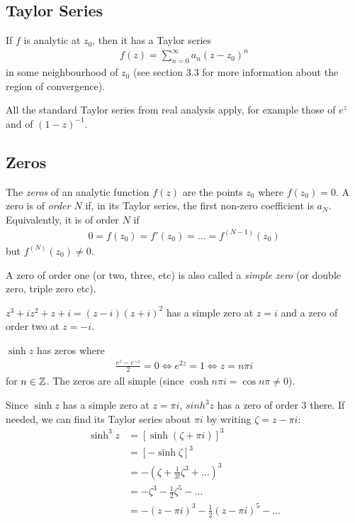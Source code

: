 \documentclass[a4paper]{article}
\begin{document}
\subsection{Taylor Series}
If $f$ is analytic at $z_0$, then it has a Taylor series 
\begin{equation*}
\begin{aligned}
f(z) = \sum_{n=0}^\infty a_n(z-z_0)^n
\end{aligned}
\end{equation*}
in some neighbourhood of $z_0$ (see section 3.3 for more information about the region of convergence).

All the standard Taylor series from real analysis apply, for example those of $e^z$ and of $(1-z)^{-1}$.

\subsection{Zeros}
The \emph{zeros} of an analytic function $f(z)$ are the points $z_0$ where $f(z_0)=0$. A zero is of \emph{order $N$} if, in its Taylor series, the first non-zero coefficient is $a_N$. Equivalently, it is of order $N$ if
\begin{equation*}
\begin{aligned}
0 = f(z_0) = f'(z_0) = ... = f^{(N-1)} (z_0)
\end{aligned}
\end{equation*}
but $f^(N) (z_0) \neq 0$.

A zero of order one (or two, three, etc) is also called a \emph{simple zero} (or double zero, triple zero etc).

\begin{eg}
$z^3+iz^2+z+i = (z-i)(z+i)^2$ has a simple zero at $z=i$ and a zero of order two at $z=-i$.
\end{eg}

\begin{eg}
$\sinh z$ has zeros where
\begin{equation*}
\begin{aligned}
\frac{e^z - e^{-z}}{2} = 0 \iff e^{2z} = 1 \iff z = n\pi i
\end{aligned}
\end{equation*}
for $n \in \mathbb{Z}$. The zeros are all simple (since $\cosh n\pi i = \cos n\pi \neq 0$).
\end{eg}

\begin{eg}
Since $\sinh z$ has a simple zero at $z= \pi i$, $sinh^3 z$ has a zero of order $3$ there. If needed, we can find its Taylor series about $\pi i$ by writing $\zeta = z-\pi i$:
\begin{equation*}
\begin{aligned}
\sinh^3 z &= [\sinh (\zeta + \pi i)]^3\\
&= [-\sinh \zeta]^3\\
&= -(\zeta + \frac{1}{3!} \zeta^3 + ...)^3\\
&= -\zeta^3 - \frac{1}{2} \zeta^5 - ...\\
&= -(z-\pi i)^3 - \frac{1}{2} (z-\pi i)^5 - ...
\end{aligned}
\end{equation*}
\end{eg}
\end{document}
